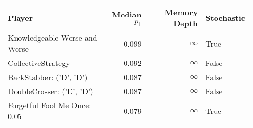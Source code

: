 \begin{tabular}{lrrl}
\toprule
                        Player &  Median $p_1$ &  Memory Depth & Stochastic \\
\midrule
 Knowledgeable Worse and Worse &         0.099 &            \(\infty\) &       True \\
            CollectiveStrategy &         0.092 &            \(\infty\) &      False \\
       BackStabber: ('D', 'D') &         0.087 &            \(\infty\) &      False \\
     DoubleCrosser: ('D', 'D') &         0.087 &            \(\infty\) &      False \\
  Forgetful Fool Me Once: 0.05 &         0.079 &            \(\infty\) &       True \\
\bottomrule
\end{tabular}
